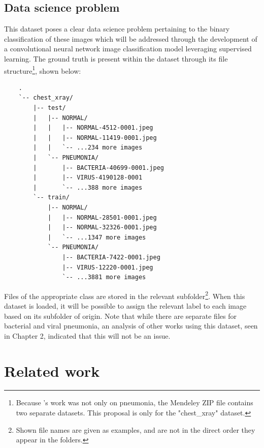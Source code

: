 \documentclass[12pt]{report}
\begin{document}
\pagebreak 

\section{Data science problem}
This dataset poses a clear data science problem pertaining to the binary classification of these images which will be addressed through the 
development of a convolutional neural network image classification model leveraging supervised learning. 
The ground truth is present within the dataset through its file structure\footnote{Because \textcite
{kermanyIdentifyingMedicalDiagnoses2018}'s work was not only on pneumonia, the Mendeley ZIP file contains two 
separate datasets. This proposal is only for the "chest\_xray" dataset.}, shown below:


\begin{verbatim}
    .
    `-- chest_xray/
        |-- test/
        |   |-- NORMAL/
        |   |   |-- NORMAL-4512-0001.jpeg
        |   |   |-- NORMAL-11419-0001.jpeg
        |   |   `-- ...234 more images
        |   `-- PNEUMONIA/
        |       |-- BACTERIA-40699-0001.jpeg
        |       |-- VIRUS-4190128-0001
        |       `-- ...388 more images
        `-- train/
            |-- NORMAL/
            |   |-- NORMAL-28501-0001.jpeg
            |   |-- NORMAL-32326-0001.jpeg
            |   `-- ...1347 more images
            `-- PNEUMONIA/
                |-- BACTERIA-7422-0001.jpeg
                |-- VIRUS-12220-0001.jpeg
                `-- ...3881 more images
\end{verbatim}

\noindent Files of the appropriate class are stored in the relevant subfolder\footnote{Shown file names are given as examples, and are not in the direct order they appear in the folders.}.
When this dataset is loaded, it will be possible to 
assign the relevant label to each image based on its subfolder of origin. Note that while there are separate files for bacterial and 
viral pneumonia, an analysis of other works using this dataset, seen in Chapter 2, indicated that this will not be an issue.




\chapter{Related work}
\end{document}
